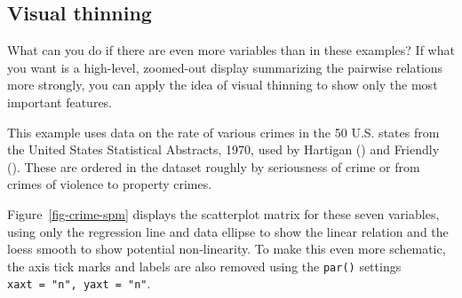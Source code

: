 \documentclass[
  letterpaper,
  10pt,
  krantz2]{krantz}
\makeatletter
\newenvironment{Shaded}{\begin{snugshade}}{\end{snugshade}}
\newcommand{\AttributeTok}[1]{\textcolor[rgb]{0.40,0.45,0.13}{#1}}
\newcommand{\CommentTok}[1]{\textcolor[rgb]{0.37,0.37,0.37}{#1}}
\newcommand{\FunctionTok}[1]{\textcolor[rgb]{0.28,0.35,0.67}{#1}}
\newcommand{\NormalTok}[1]{\textcolor[rgb]{0.00,0.23,0.31}{#1}}
\newcommand{\StringTok}[1]{\textcolor[rgb]{0.13,0.47,0.30}{#1}}
\newenvironment{kframe}{%
  \medskip{}
  \setlength{\fboxsep}{.8em}
  \def\at@end@of@kframe{}%
  \ifinner\ifhmode%
  \def\at@end@of@kframe{\end{minipage}}%
  \begin{minipage}{\columnwidth}%
  \fi\fi%
  \def\FrameCommand##1{\hskip\@totalleftmargin \hskip-\fboxsep
  \colorbox{shadecolor}{##1}\hskip-\fboxsep
      \hskip-\linewidth \hskip-\@totalleftmargin \hskip\columnwidth}%
  \MakeFramed {\advance\hsize-\width
    \@totalleftmargin\z@ \linewidth\hsize
    \@setminipage}}%
{\par\unskip\endMakeFramed%
  \at@end@of@kframe}
\renewenvironment{Shaded}{\begin{kframe}}{\end{kframe}}
\makeatother
\begin{document}
\subsection{Visual thinning}\label{visual-thinning}

What can you do if there are even more variables than in these examples?
If what you want is a high-level, zoomed-out display summarizing the
pairwise relations more strongly, you can apply the idea of visual
thinning to show only the most important features.

This example uses data on the rate of various crimes in the 50 U.S.
states from the United States Statistical Abstracts, 1970, used by
Hartigan () and Friendly
(). These are ordered in the dataset
roughly by seriousness of crime or from crimes of violence to property
crimes.

\begin{Shaded}
\end{Shaded}

Figure~\ref{fig-crime-spm} displays the scatterplot matrix for these
seven variables, using only the regression line and data ellipse to show
the linear relation and the loess smooth to show potential
non-linearity. To make this even more schematic, the axis tick marks and
labels are also removed using the \texttt{par()} settings
\texttt{xaxt\ =\ "n",\ yaxt\ =\ "n"}.
\end{document}
